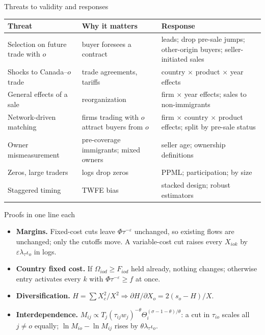\documentclass[11pt,aspectratio=169,notes]{beamer}
\begin{document}
\begin{frame}{Threats to validity and responses}
\vspace{0.1cm}
\scriptsize
\renewcommand{\arraystretch}{1.25}
\begin{tabularx}{\textwidth}{@{}>{\raggedright\arraybackslash}p{3.4cm}>{\raggedright\arraybackslash}p{4.2cm}X@{}}
\toprule
\textbf{Threat} & \textbf{Why it matters} & \textbf{Response}\\
\midrule
Selection on future trade with $o$ & buyer foresees a contract & leads; drop pre-sale jumps; other-origin buyers; seller-initiated sales\\
Shocks to Canada--$o$ trade & trade agreements, tariffs & country $\times$ product $\times$ year effects\\
General effects of a sale & reorganization & firm $\times$ year effects; sales to non-immigrants\\
Network-driven matching & firms trading with $o$ attract buyers from $o$ & firm $\times$ country $\times$ product effects; split by pre-sale status\\
Owner mismeasurement & pre-coverage immigrants; mixed owners & seller age; ownership definitions\\
Zeros, large traders & logs drop zeros & PPML; participation; by size\\
Staggered timing & TWFE bias & stacked design; robust estimators\\
\bottomrule
\end{tabularx}
\end{frame}

\begin{frame}{Proofs in one line each}
\vspace{0.2cm}
\small
\begin{itemize}\setlength{\itemsep}{7pt}
\item \textbf{Margins.} Fixed-cost cuts leave $\Phi\tau^{-\varepsilon}$ unchanged, so existing flows are unchanged; only the cutoffs move. A variable-cost cut raises every $X_{iok}$ by $\varepsilon\lambda_\tau\iota_o$ in logs.
\item \textbf{Country fixed cost.} If $\Omega_{iod}\ge F_{iod}$ held already, nothing changes; otherwise entry activates every $k$ with $\Phi\tau^{-\varepsilon}\ge f$ at once.
\item \textbf{Diversification.} $H=\sum X_c^2/X^2\Rightarrow\partial H/\partial X_o=2(s_o-H)/X$.
\item \textbf{Interdependence.} $M_{ij}\propto T_j(\tau_{ij}w_j)^{-\theta}\Theta_i^{(\sigma-1-\theta)/\theta}$: a cut in $\tau_{io}$ scales all $j\neq o$ equally; $\ln M_{io}-\ln M_{ij}$ rises by $\theta\lambda_\tau\iota_o$.
\end{itemize}
\end{frame}
\end{document}
